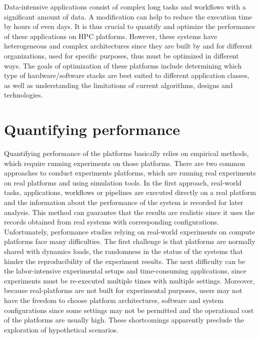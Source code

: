 Data-intensive applications consist of complex long tasks and workflows 
with a significant amount of data. 
A modification can help to reduce the execution time by hours of even days. 
It is thus crucial to quantify and optimize the performance of these applications 
on HPC platforms. 
However, these systems have heterogeneous and complex architectures since they 
are built by and for different organizations, used for specific purposes, thus must be 
optimized in different ways. 
The goals of optimization of these platforms include determining which type of 
hardware/software stacks are best suited to different application classes, 
as well as understanding the limitations of current algorithms, designs and technologies. 

\section{Quantifying performance}

Quantifying performance of the platforms basically relies on empirical methods, 
which require running experiments on those platforms. 
There are two common approaches to conduct experiments platforms, which are 
running real experiments on real platforms and using simulation tools. 
In the first approach, real-world tasks, applications, workflows or pipelines are executed 
directly on a real platform and the information about the performance of the system 
is recorded for later analysis. 
This method can guarantee that the results are realistic since it uses the records 
obtained from real systems with corresponding configurations.
Unfortunately, performance studies relying on real-world experiments on 
compute platforms face many difficulties.
The first challenge is that platforms are normally shared with dynamics loads,
the randomness in the status of the systems that hinder the reproducibility 
of the experiment results.
The next difficulty can be the labor-intensive experimental setups and 
time-consuming applications, since experiments must be re-executed 
multiple times with multiple settings. 
Moreover, because real-platforms are not built for experimental purposes,
users may not have the freedom to choose platform architectures, software and 
system configurations since some settings may not be permitted and the 
operational cost of the platforms are usually high. 
These shortcomings apparently preclude the exploration of hypothetical scenarios.

